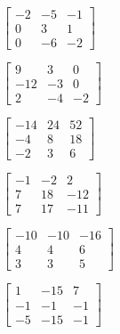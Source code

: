 \begin{exercise}
\begin{Parts}
\item \(\begin{bmatrix} -2 & -5 & -1
\\0 & 3 & 1
\\0 & -6 & -2 \end{bmatrix}\)

\item \(\begin{bmatrix} 9 & 3 & 0
\\-12 & -3 & 0
\\2 & -4 & -2 \end{bmatrix}\)

\begin{OmitV1}
\item \(\begin{bmatrix} -14 & 24 & 52
\\-4 & 8 & 18
\\-2 & 3 & 6 \end{bmatrix}\)

\item \(\begin{bmatrix} -1 & -2 & 2
\\7 & 18 & -12
\\7 & 17 & -11 \end{bmatrix}\)
\end{OmitV1}

\item \(\begin{bmatrix} -10 & -10 & -16
\\4 & 4 & 6
\\3 & 3 & 5 \end{bmatrix}\)

\item \(\begin{bmatrix} 1 & -15 & 7
\\-1 & -1 & -1
\\-5 & -15 & -1 \end{bmatrix}\)

\end{Parts}
\end{exercise}






